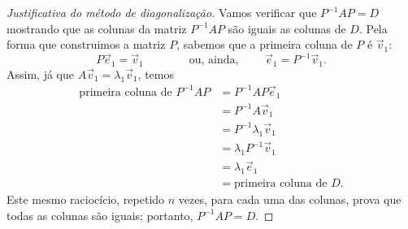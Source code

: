 \documentclass[../livro.tex]{subfiles}  %
\begin{document}
\begin{proof}[Justificativa do método de diagonalização]
Vamos verificar que $P^{-1} A P = D$ mostrando que as colunas da matriz $P^{-1} A P$ são iguais as colunas de $D$. Pela forma que construimos a matriz $P$, sabemos que a primeira coluna de $P$ é $\vec{v}_1$: 
\[
P \vec{e}_1 = \vec{v}_1 \qquad \qquad \text{ou, ainda, } \qquad  \vec{e}_1 = P^{-1} \vec{v}_1.
\] Assim, já que $A \vec{v}_1 = \lambda_1 \vec{v}_1$, temos
\begin{equation}
\begin{split}
\text{primeira coluna de } P^{-1} A P  & = P^{-1} A P \vec{e}_1 \\
                                       & = P^{-1} A \vec{v}_1 \\
                                       & = P^{-1} \lambda_1 \vec{v}_1 \\
                                       & = \lambda_1 P^{-1} \vec{v}_1 \\
                                       & = \lambda_1 \vec{e}_1 \\
                                       & = \text{primeira coluna de } D.
\end{split}
\end{equation}
Este mesmo raciocício, repetido $n$ vezes, para cada uma das colunas, prova que todas as colunas são iguais; portanto, $P^{-1} A P = D$.
\end{proof}
\end{document}
